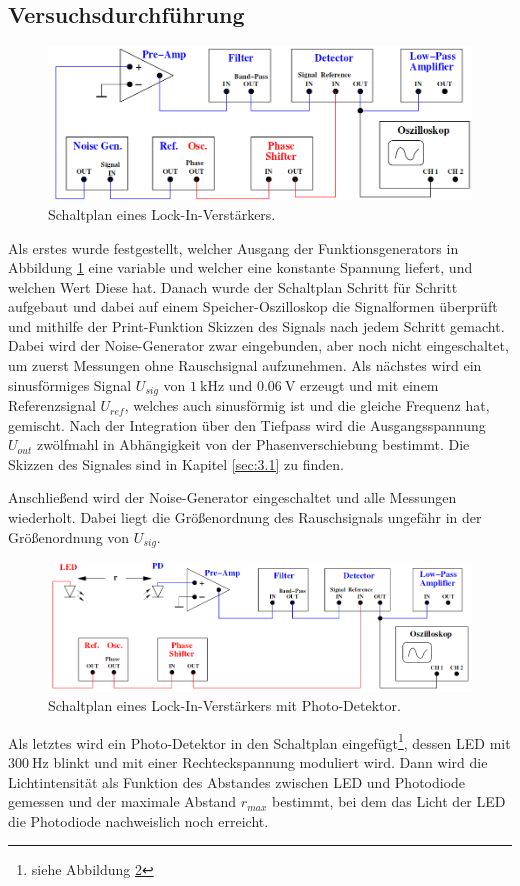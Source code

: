 \subsection{Versuchsdurchführung}
\begin{figure}
  \centering
  \includegraphics[scale=0.3]{durch.png}
  \caption{Schaltplan eines Lock-In-Verstärkers.}
  \label{fig:3}
\end{figure}
Als erstes wurde festgestellt, welcher Ausgang der Funktionsgenerators in Abbildung
\ref{fig:3} eine variable und welcher eine konstante Spannung liefert, und welchen
Wert Diese hat. Danach wurde der Schaltplan Schritt für Schritt aufgebaut und dabei
auf einem Speicher-Oszilloskop die Signalformen überprüft und mithilfe der Print-Funktion
Skizzen des Signals nach jedem Schritt gemacht. Dabei wird der Noise-Generator
zwar eingebunden, aber noch nicht eingeschaltet, um zuerst Messungen ohne Rauschsignal
aufzunehmen. Als nächstes wird ein sinusförmiges Signal $U_{sig}$ von
$\SI{1}{\kilo\hertz}$ und $\SI{0.06}{\volt}$ erzeugt und mit einem Referenzsignal
$U_{ref}$, welches auch sinusförmig ist und die gleiche Frequenz hat, gemischt.
Nach der Integration über den Tiefpass wird die Ausgangsspannung $U_{out}$
zwölfmahl in Abhängigkeit von der Phasenverschiebung bestimmt. Die Skizzen des Signales
sind in Kapitel \ref{sec:3.1} zu finden.

Anschließend wird der Noise-Generator eingeschaltet und alle Messungen wiederholt.
Dabei liegt die Größenordnung des Rauschsignals ungefähr in der Größenordnung
von $U_{sig}$.

\begin{figure}
  \centering
  \includegraphics[scale=0.3]{durch2.png}
  \caption{Schaltplan eines Lock-In-Verstärkers mit Photo-Detektor.}
  \label{fig:4}
\end{figure}
Als letztes wird ein Photo-Detektor in den Schaltplan eingefügt\footnote{siehe Abbildung \ref{fig:4}},
dessen LED mit $\SI{300}{\hertz}$
blinkt und mit einer Rechteckspannung moduliert wird. Dann wird die Lichtintensität
als Funktion des Abstandes zwischen LED und Photodiode gemessen und der maximale
Abstand $r_{max}$ bestimmt, bei dem das Licht der LED die Photodiode nachweislich
noch erreicht.


